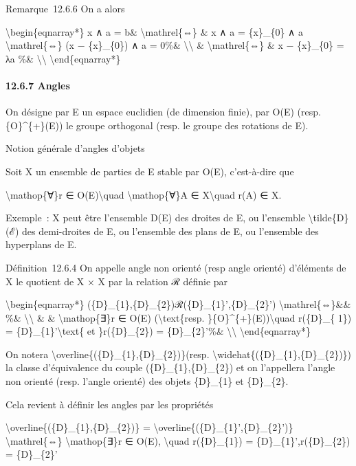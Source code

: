 \documentclass[]{article}
\begin{document}
Remarque~12.6.6 On a alors

\textbackslash{}begin\{eqnarray*\} x ∧ a = b\&
\textbackslash{}mathrel\{⇔\} \& x ∧ a = \{x\}\_\{0\} ∧ a
\textbackslash{}mathrel\{⇔\} (x − \{x\}\_\{0\}) ∧ a = 0\%\&
\textbackslash{}\textbackslash{} \& \textbackslash{}mathrel\{⇔\} \& x −
\{x\}\_\{0\} = λa \%\& \textbackslash{}\textbackslash{}
\textbackslash{}end\{eqnarray*\}

\paragraph{12.6.7 Angles}

On désigne par E un espace euclidien (de dimension finie), par O(E)
(resp. \{O\}\^{}\{+\}(E)) le groupe orthogonal (resp. le groupe des
rotations de E).

Notion générale d'angles d'objets

Soit X un ensemble de parties de E stable par O(E), c'est-à-dire que

\textbackslash{}mathop\{∀\}r ∈ O(E)\textbackslash{}quad
\textbackslash{}mathop\{∀\}A ∈ X\textbackslash{}quad r(A) ∈ X.

Exemple~: X peut être l'ensemble D(E) des droites de E, ou l'ensemble
\textbackslash{}tilde\{D\}(ℰ) des demi-droites de E, ou l'ensemble des
plans de E, ou l'ensemble des hyperplans de E.

Définition~12.6.4 On appelle angle non orienté (resp angle orienté)
d'éléments de X le quotient de X × X par la relation ℛ définie par

\textbackslash{}begin\{eqnarray*\}
(\{D\}\_\{1\},\{D\}\_\{2\})ℛ(\{D\}\_\{1\}',\{D\}\_\{2\}')
\textbackslash{}mathrel\{⇔\}\&\& \%\& \textbackslash{}\textbackslash{}
\& \& \textbackslash{}mathop\{∃\}r ∈ O(E) (\textbackslash{}text\{resp.
\}\{O\}\^{}\{+\}(E))\textbackslash{}quad r(\{D\}\_\{ 1\}) =
\{D\}\_\{1\}'\textbackslash{}text\{ et \}r(\{D\}\_\{2\}) =
\{D\}\_\{2\}'\%\& \textbackslash{}\textbackslash{}
\textbackslash{}end\{eqnarray*\}

On notera \textbackslash{}overline\{(\{D\}\_\{1\},\{D\}\_\{2\})\}(resp.
\textbackslash{}widehat\{(\{D\}\_\{1\},\{D\}\_\{2\})\}) la classe
d'équivalence du couple (\{D\}\_\{1\},\{D\}\_\{2\}) et on l'appellera
l'angle non orienté (resp. l'angle orienté) des objets \{D\}\_\{1\} et
\{D\}\_\{2\}.

Cela revient à définir les angles par les propriétés

\textbackslash{}overline\{(\{D\}\_\{1\},\{D\}\_\{2\})\} =
\textbackslash{}overline\{(\{D\}\_\{1\}',\{D\}\_\{2\}')\}
\textbackslash{}mathrel\{⇔\} \textbackslash{}mathop\{∃\}r ∈ O(E),
\textbackslash{}quad r(\{D\}\_\{1\}) = \{D\}\_\{1\}',r(\{D\}\_\{2\}) =
\{D\}\_\{2\}'
\end{document}
